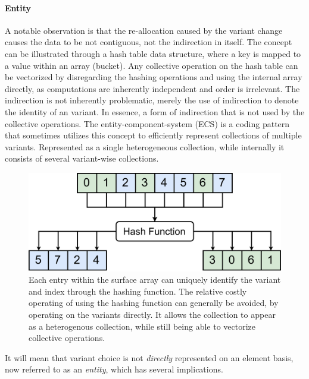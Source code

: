 \documentclass{article}
\begin{document}
\newpage

\paragraph{Entity}

A notable observation is that the re-allocation caused by the variant change causes the data to be not contiguous, not the indirection in itself.
The concept can be illustrated through a hash table data structure, where a key is mapped to a value within an array (bucket).
Any collective operation on the hash table can be vectorized by disregarding the hashing operations and using the internal array directly, as computations are inherently independent and order is irrelevant.   
The indirection is not inherently problematic, merely the use of indirection to denote the identity of an variant.
In essence, a form of indirection that is not used by the collective operations. 
The entity-component-system (ECS) is a coding pattern that sometimes utilizes this concept to efficiently represent collections of multiple variants.
Represented as a single heterogeneous collection, while internally it consists of several variant-wise collections. 

\begin{figure}[ht]
    \centering
    \includegraphics[scale=0.1]{HashTableECS.png}
    \caption
    { 
        Each entry within the surface array can uniquely identify the variant and index through the hashing function.
        The relative costly operating of using the hashing function can generally be avoided, by operating on the variants directly.
        It allows the collection to appear as a heterogenous collection, while still being able to vectorize collective operations.
    }
\end{figure}

It will mean that variant choice is not {\it directly} represented on an element basis, now referred to as an {\it entity}, which has several implications.
\end{document}
